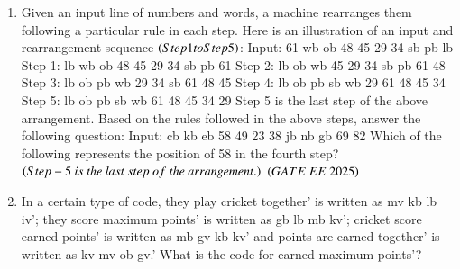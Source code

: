 \documentclass[journal,12pt,onecolumn]{IEEEtran}
\theoremstyle{remark}
\begin{document}
\begin{enumerate}
\begin{enumerate}
    \end{enumerate}
   \item { Given an input line of numbers and words, a machine rearranges them following a particular rule in each step. Here is an illustration of an input and rearrangement sequence  $\left(Step 1 to Step 5\right)$: \newline
Input: 61 wb ob 48 45 29 34 sb pb lb \newline
Step 1: lb wb ob 48 45 29 34 sb pb 61 \newline
Step 2: lb ob wb 45 29 34 sb pb 61 48 \newline
Step 3: lb ob pb wb 29 34 sb 61 48 45 \newline
Step 4: lb ob pb sb wb 29 61 48 45 34 \newline
Step 5: lb ob pb sb wb 61 48 45 34 29 \newline
Step 5 is the last step of the above arrangement. \newline
Based on the rules followed in the above steps, answer the following question: \newline
Input: cb kb eb 58 49 23 38 jb nb gb 69 82 \newline
Which of the following represents the position of 58 in the fourth step?\\ $\brak{Step-5\ is\ the\ last\ step\ of\ the\ arrangement.}$ }     
\hfill $\brak{GATE\ EE\ 2025}$
    \begin{enumerate}
      \end{enumerate}
   \item In a certain type of code, they play cricket together' is written as mv kb lb iv'; they score maximum points' is written as gb lb mb kv'; cricket score earned points' is written as mb gv kb kv' and points are earned together' is written as kv mv ob gv.' 
What is the code for earned maximum points'?

\end{enumerate}
\end{document}
